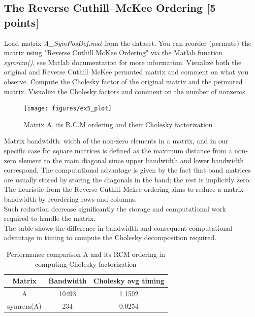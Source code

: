\documentclass[unicode,11pt,a4paper,oneside,numbers=endperiod,openany]{scrartcl}
\begin{document}
\cleardoublepage

\subsection{The Reverse Cuthill--McKee Ordering [5 points]}

Load matrix \textit{A\_SymPosDef.mat} from the dataset.
You can reorder (permute) the matrix using "Reverse Cuthill McKee Ordering"
via the Matlab function \textit{symrcm()}, see Matlab documentation for more information.
Visualize both the original and Reverse Cuthill McKee permuted matrix and comment on what you observe.
Compute the Cholesky factor of the original matrix and the permuted matrix.
Visualize the Cholesky factors and comment on the number of nonzeros.

\begin{figure}[H]
    \centering
    \texttt{[image: figures/ex5\_plot]}
    \caption{Matrix A, its R.C.M ordering and their Cholesky factorization}
    \label{fig:ex5_plot}
\end{figure}


Matrix bandwidth: width of the non-zero elements in a matrix, and in our specific case for square matrices
is defined as the maximum distance from a non-zero element to the main diagonal
since upper bandwidth and lower bandwidth correspond.
The computational advantage is given by the fact that band matrices are usually stored
by storing the diagonals in the band; the rest is implicitly zero.\\

The heuristic from the Reverse Cuthill Mckee ordering aims to reduce a matrix bandwidth
by reordering rows and columns. \\
Such reduction decrease significantly the storage and computational work required to handle the matrix. \\
The table shows the difference in bandwidth and consequent computational advantage in timing to compute
the Cholesky decomposition required.

\begin{table}[H]
    \centering
    \begin{tabular}{||c c c||}
        \hline
        Matrix    & Bandwidth & Cholesky avg timing \\ [0.5ex]
        \hline\hline
        A         & 10493     & 1.1592              \\
        symrcm(A) & 234       & 0.0254              \\ [1ex]
        \hline
    \end{tabular}
    \caption{Performance comparison A and its RCM ordering in computing Cholesky factorization}
    \label{table:ex5_cholesky_performance}
\end{table}
\end{document}
